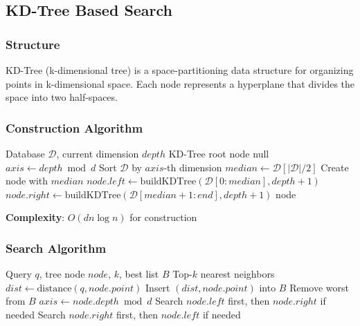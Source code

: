 \documentclass[12pt,a4paper]{article}
\begin{document}
\subsection{KD-Tree Based Search}

\subsubsection{Structure}
KD-Tree (k-dimensional tree) is a space-partitioning data structure for organizing points in k-dimensional space. Each node represents a hyperplane that divides the space into two half-spaces.

\subsubsection{Construction Algorithm}
\begin{algorithm}
\caption{Build KD-Tree}
\begin{algorithmic}[1]
\Require Database $\mathcal{D}$, current dimension $depth$
\Ensure KD-Tree root node
    \State \Return null
\EndIf
\State $axis \gets depth \bmod d$
\State Sort $\mathcal{D}$ by $axis$-th dimension
\State $median \gets \mathcal{D}[|\mathcal{D}|/2]$
\State Create node with $median$
\State $node.left \gets \text{buildKDTree}(\mathcal{D}[0:median], depth+1)$
\State $node.right \gets \text{buildKDTree}(\mathcal{D}[median+1:end], depth+1)$
\State \Return node
\end{algorithmic}
\end{algorithm}

\textbf{Complexity}: $O(dn \log n)$ for construction

\subsubsection{Search Algorithm}
\begin{algorithm}
\caption{KD-Tree k-NN Search}
\begin{algorithmic}[1]
\Require Query $q$, tree node $node$, $k$, best list $B$
\Ensure Top-$k$ nearest neighbors
    \State \Return
\EndIf
\State $dist \gets \text{distance}(q, node.point)$
    \State Insert $(dist, node.point)$ into $B$
        \State Remove worst from $B$
    \EndIf
\EndIf
\State $axis \gets node.depth \bmod d$
    \State Search $node.left$ first, then $node.right$ if needed
\Else
    \State Search $node.right$ first, then $node.left$ if needed
\EndIf
\end{algorithmic}
\end{algorithm}
\end{document}
